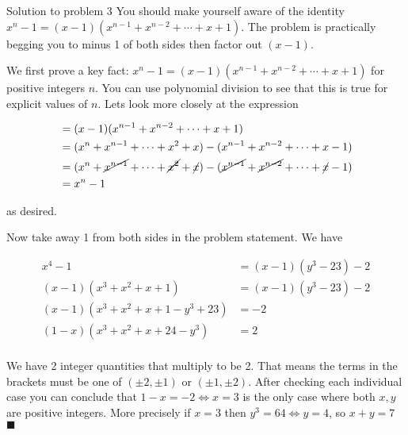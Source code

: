 \documentclass{article}
\begin{document}
\begin{solution}{Solution to problem 3}
You should make yourself aware of the identity $x^n - 1 = (x-1)(x^{n-1} + x^{n-2} + \cdots + x + 1)$.
The problem is practically begging you to minus 1 of both sides then factor out $(x-1)$.
\vspace{0.2cm}

We first prove a key fact: $x^n - 1 = (x-1)(x^{n-1} + x^{n-2} + \cdots + x + 1)$ for positive integers $n$.
You can use polynomial division to see that this is true for explicit values of $n$. Lets look more closely at the expression

\[
\begin{aligned}
&= (x-1)(x^{n-1} + x^{n-2} + \cdots + x + 1) \\
&= (x^n + x^{n-1} + \cdots + x^2 + x) - (x^{n-1} + x^{n-2} + \cdots + x - 1) \\
&= (x^n + \cancel{x^{n-1}} + \cdots + \cancel{x^2} + \cancel{x}) - (\cancel{x^{n-1}} + \cancel{x^{n-2}} + \cdots + \cancel{x} - 1) \\
&= x^n - 1\\
\end{aligned}
\]

as desired. \vspace{0.2cm}

Now take away 1 from both sides in the problem statement. We have

\[
\begin{aligned}
x^4-1 &= (x-1)(y^3 - 23) - 2\\
(x-1)(x^3 + x^2 + x + 1) &= (x-1)(y^3 - 23) - 2\\
(x-1)(x^3 + x^2 + x + 1 - y^3 + 23) &= -2\\
(1-x)(x^3 + x^2 + x + 24 - y^3) &= 2\\
\end{aligned}
\]

We have 2 integer quantities that multiply to be 2. That means the
terms in the brackets must be one of $(\pm 2, \pm1)$ or $(\pm 1, \pm 2)$.
After checking each individual case you can conclude that $1-x = -2 \iff x=3$
is the only case where both $x,y$ are positive integers. More precisely if
$x=3$ then $y^3 = 64 \iff y = 4$, so $\boxed{x+y = 7}$  $\blacksquare$
\end{solution}
\end{document}
